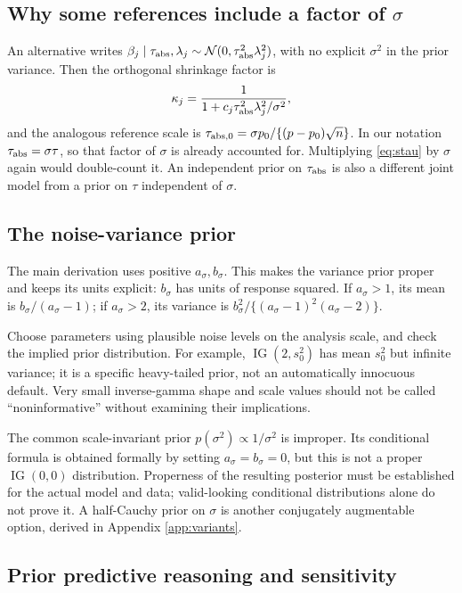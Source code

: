 \documentclass[11pt,letterpaper]{article}
\numberwithin{equation}{section}
\newcommand{\IG}{\operatorname{IG}}
\newcommand{\Normal}{\mathcal{N}}
\newcommand{\given}{\mid}
\begin{document}
\subsection{Why some references include a factor of \texorpdfstring{\(\sigma\)}{sigma}}

An alternative writes
\(\beta_j\given\tau_{\rm abs},\lambda_j\sim
\Normal(0,\tau_{\rm abs}^2\lambda_j^2)\), with no explicit \(\sigma^2\)
in the prior variance. Then the orthogonal shrinkage factor is
\[
 \kappa_j=\frac{1}{1+c_j\tau_{\rm abs}^2\lambda_j^2/\sigma^2},
\]
and the analogous reference scale is
\(\tau_{{\rm abs},0}=\sigma p_0/\{(p-p_0)\sqrt n\}\).
In our notation \(\tau_{\rm abs}=\sigma\tau\), so that factor of
\(\sigma\) is already accounted for. Multiplying \eqref{eq:stau} by
\(\sigma\) again would double-count it. An independent prior on
\(\tau_{\rm abs}\) is also a different joint model from a prior on
\(\tau\) independent of \(\sigma\).

\subsection{The noise-variance prior}

The main derivation uses positive \(a_\sigma,b_\sigma\). This makes the
variance prior proper and keeps its units explicit: \(b_\sigma\) has units
of response squared. If \(a_\sigma>1\), its mean is
\(b_\sigma/(a_\sigma-1)\); if \(a_\sigma>2\), its variance is
\(b_\sigma^2/\{(a_\sigma-1)^2(a_\sigma-2)\}\).

Choose parameters using plausible noise levels on the analysis scale, and
check the implied prior distribution. For example,
\(\IG(2,s_0^2)\) has mean \(s_0^2\) but infinite variance; it is a specific
heavy-tailed prior, not an automatically innocuous default. Very small
inverse-gamma shape and scale values should not be called ``noninformative''
without examining their implications.

The common scale-invariant prior \(p(\sigma^2)\propto1/\sigma^2\) is
improper. Its conditional formula is obtained formally by setting
\(a_\sigma=b_\sigma=0\), but this is not a proper \(\IG(0,0)\)
distribution. Properness of the resulting posterior must be established for
the actual model and data; valid-looking conditional distributions alone do
not prove it. A half-Cauchy prior on \(\sigma\) is another conjugately
augmentable option, derived in Appendix \ref{app:variants}.

\subsection{Prior predictive reasoning and sensitivity}
\end{document}
